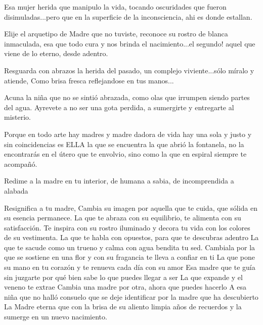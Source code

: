 \documentclass[12pt, a4paper, twoside]{book} %
\begin{document}
Esa mujer herida que manipulo la vida, tocando oscuridades que fueron disimuladas...pero que en la superficie de la inconsciencia, ahi es donde estallan.

Elije el arquetipo de Madre que no tuviste, reconoce su rostro de blanca inmaculada, esa que todo cura y nos brinda el nacimiento...el segundo! aquel que viene de lo eterno, desde adentro.

Resguarda con abrazos la herida del pasado, un complejo viviente...sólo míralo y atiende,
Como brisa fresca reflejandose en tus manos...

Acuna la niña que no se sintió abrazada, como olas que irrumpen siendo partes del agua.
Ayrevete  a no ser  una gota perdida, a sumergirte y entregarte al misterio.

Porque en todo arte hay madres y madre dadora de vida hay una sola y justo y sin coincidencias es ELLA la que se encuentra la que abrió la fontanela, no la encontrarás en el  útero que te envolvio, sino como  la que en espiral siempre te acompañó.

Redime a la madre en tu interior, de humana a sabia, de incomprendida a alabada


Resignifica a tu madre,
Cambia su imagen por aquella que te cuida, que sólida en su esencia permanece.
La que te abraza con su equilibrio, te alimenta con su satisfacción.
Te inspira con su rostro iluminado y decora tu vida con los colores de su vestimenta.
La que te habla con opuestos, para que te descubras adentro
La que te sacude como un trueno y calma con agua bendita tu sed.
Cambiala por la que se sostiene en una flor y con su fragancia te lleva a confiar en ti
La que pone su mano en tu corazón y te renueva cada día con su amor
Esa madre que te guía sin juzgarte por qué bien sabe lo que puedes llegar a ser
La que expande y el veneno te extrae
Cambia una madre por otra, ahora que puedes hacerlo
A esa niña que no halló consuelo que se deje identificar por la madre que ha descubierto
La Madre eterna que con la brisa de su aliento limpia años de recuerdos y la sumerge en un nuevo nacimiento.
\end{document}
